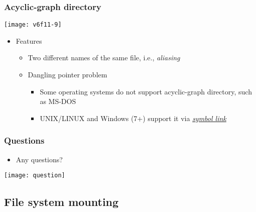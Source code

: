 \documentclass[CJKutf8,dvipsnames,table]{beamer}
\begin{document}
\begin{CJK*}{UTF8}{song}
  \begin{frame}
    \frametitle{Acyclic-graph directory} \pause
    \begin{center}
      \texttt{[image: v6f11-9]} \pause
    \end{center}
    \begin{itemize}
    \item Features \pause
      \begin{itemize}
      \item Two different names of the same file, i.e., \emph{aliasing} \pause
      \item Dangling pointer problem \pause
        \begin{itemize}
        \item Some operating systems do not support acyclic-graph directory, such as MS-DOS \pause
        \item UNIX/LINUX and Windows (7+) support it via \href{https://en.wikipedia.org/wiki/Symbolic\_link}{\emph{symbol link}}
        \end{itemize}
      \end{itemize}
    \end{itemize}
  \end{frame}

  \begin{frame}
    \frametitle{Questions}
    \begin{itemize}
    \item Any questions?
    \end{itemize}
    \begin{center}
      \texttt{[image: question]}
    \end{center}
  \end{frame}

  \subsection{File system mounting}


\end{CJK*}
\end{document}
